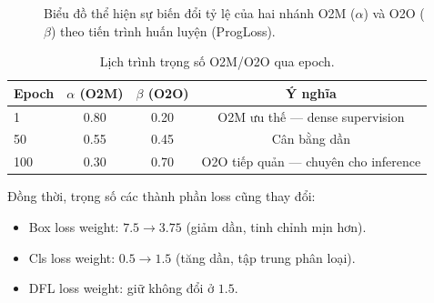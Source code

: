 \begin{figure}[H]
\centering
{}
\caption{Biểu đồ thể hiện sự biến đổi tỷ lệ của hai nhánh O2M ($\alpha$) và O2O ($\beta$) theo tiến trình huấn luyện (ProgLoss).}
\label{fig:progloss_curves}
\end{figure}


\begin{table}[H]
\centering
\caption{Lịch trình trọng số O2M/O2O qua epoch.}
\label{tab:o2m_o2o_schedule}
\begin{tabular}{lccc}
\toprule
\textbf{Epoch} & \textbf{$\alpha$ (O2M)} & \textbf{$\beta$ (O2O)} & \textbf{Ý nghĩa} \\
\midrule
1   & 0.80 & 0.20 & O2M ưu thế --- dense supervision \\
50  & 0.55 & 0.45 & Cân bằng dần \\
100 & 0.30 & 0.70 & O2O tiếp quản --- chuyên cho inference \\
\bottomrule
\end{tabular}
\end{table}

Đồng thời, trọng số các thành phần loss cũng thay đổi:
\begin{itemize}
    \item Box loss weight: $7.5 \to 3.75$ (giảm dần, tinh chỉnh mịn hơn).
    \item Cls loss weight: $0.5 \to 1.5$ (tăng dần, tập trung phân loại).
    \item DFL loss weight: giữ không đổi ở $1.5$.
\end{itemize}

